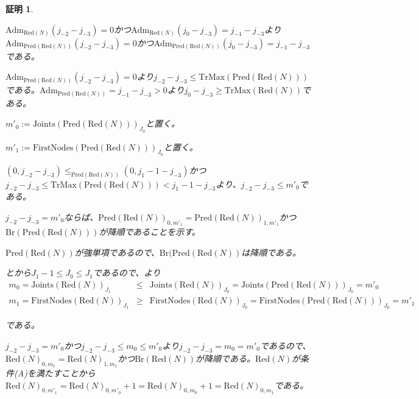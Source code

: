\documentclass[dvipdfmx,uplatex]{jsarticle}
\theoremstyle{customnonumberbreakfortheorem}
\theoremstyle{customnonumberbreakforproof}
\newtheorem{hideableproof}{証明}
\begin{document}
\begin{hideableproof}
\begin{indented}
\begin{indented}
			\item \(\textrm{Adm}_{\textrm{Red}(N)}(j_{-2}-j_{-3}) = 0\)かつ\(\textrm{Adm}_{\textrm{Red}(N)}(j_0-j_{-3}) = j_{-1}-j_{-3}\)より\(\textrm{Adm}_{\textrm{Pred}(\textrm{Red}(N))}(j_{-2}-j_{-3}) = 0\)かつ\(\textrm{Adm}_{\textrm{Pred}(\textrm{Red}(N))}(j_0-j_{-3}) = j_{-1}-j_{-3}\)である。
			\item \(\textrm{Adm}_{\textrm{Pred}(\textrm{Red}(N))}(j_{-2}-j_{-3}) = 0\)より\(j_{-2}-j_{-3} \leq \textrm{TrMax}(\textrm{Pred}(\textrm{Red}(N)))\)である。\(\textrm{Adm}_{\textrm{Pred}(\textrm{Red}(N))} = j_{-1}-j_{-3} > 0\)より\(j_0-j_{-3} \geq \textrm{TrMax}(\textrm{Red}(N))\)である。
			\item \(m'_0 := \textrm{Joints}(\textrm{Pred}(\textrm{Red}(N)))_{J_0}\)と置く。
			\item \(m'_1 := \textrm{FirstNodes}(\textrm{Pred}(\textrm{Red}(N)))_{J_0}\)と置く。
			\item \((0,j_{-2}-j_{-3}) \leq_{\textrm{Pred}(\textrm{Red}(N))} (0,j_1-1-j_{-3})\)かつ\(j_{-2}-j_{-3} \leq \textrm{TrMax}(\textrm{Pred}(\textrm{Red}(N))) < j_1-1-j_{-3}\)より、\(j_{-2}-j_{-3} \leq m'_0\)である。
			\item
			\item \(j_{-2}-j_{-3} = m'_0\)ならば、\(\textrm{Pred}(\textrm{Red}(N))_{0,m'_1} = \textrm{Pred}(\textrm{Red}(N))_{1,m'_1}\)かつ\(\textrm{Br}(\textrm{Pred}(\textrm{Red}(N)))\)が降順であることを示す。
			\begin{indented}
				\item \(\textrm{Pred}(\textrm{Red}(N))\)が強単項であるので、\(\textrm{Br}(\textrm{Pred}(\textrm{Red}(N))\)は降順である。
				\item {}とから\(J_1-1 \leq J_0 \leq J_1\)であるので、より
				\begin{eqnarray*}
				m_0 = \textrm{Joints}(\textrm{Red}(N))_{J_1} & \leq & \textrm{Joints}(\textrm{Red}(N))_{J_0} = \textrm{Joints}(\textrm{Pred}(\textrm{Red}(N)))_{J_0} =m'_0 \\
				m_1 = \textrm{FirstNodes}(\textrm{Red}(N))_{J_1} & \geq & \textrm{FirstNodes}(\textrm{Red}(N))_{J_0} = \textrm{FirstNodes}(\textrm{Pred}(\textrm{Red}(N)))_{J_0} =m'_1
				\end{eqnarray*}
				\item である。
				\item \(j_{-2}-j_{-3} = m'_0\)かつ\(j_{-2}-j_{-3} \leq m_0 \leq m'_0\)より\(j_{-2}-j_{-3} = m_0 = m'_0\)であるので、\(\textrm{Red}(N)_{0,m_1} = \textrm{Red}(N)_{1,m_1}\)かつ\(\textrm{Br}(\textrm{Red}(N))\)が降順である。\(\textrm{Red}(N)\)が条件(A)を満たすことから\(\textrm{Red}(N)_{0,m'_1} = \textrm{Red}(N)_{0,m'_0}+1 = \textrm{Red}(N)_{0,m_0}+1 = \textrm{Red}(N)_{0,m_1}\)である。

\end{indented}
\end{indented}
\end{indented}
\end{hideableproof}
\end{document}
